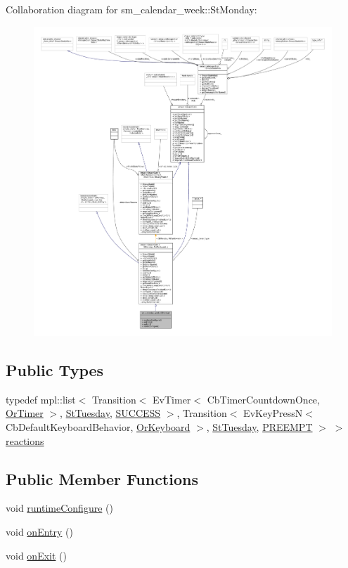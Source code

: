 Collaboration diagram for sm\+\_\+calendar\+\_\+week\+:\+:St\+Monday\+:
\nopagebreak
\begin{figure}[H]
\begin{center}
\leavevmode
\includegraphics[width=350pt]{structsm__calendar__week_1_1StMonday__coll__graph}
\end{center}
\end{figure}
\subsection*{Public Types}
\begin{DoxyCompactItemize}
\item 
typedef mpl\+::list$<$ Transition$<$ Ev\+Timer$<$ Cb\+Timer\+Countdown\+Once, \hyperlink{classsm__calendar__week_1_1OrTimer}{Or\+Timer} $>$, \hyperlink{structsm__calendar__week_1_1StTuesday}{St\+Tuesday}, \hyperlink{classSUCCESS}{S\+U\+C\+C\+E\+SS} $>$, Transition$<$ Ev\+Key\+PressN$<$ Cb\+Default\+Keyboard\+Behavior, \hyperlink{classsm__calendar__week_1_1OrKeyboard}{Or\+Keyboard} $>$, \hyperlink{structsm__calendar__week_1_1StTuesday}{St\+Tuesday}, \hyperlink{classPREEMPT}{P\+R\+E\+E\+M\+PT} $>$ $>$ \hyperlink{structsm__calendar__week_1_1StMonday_a6fee9231d13553ae7370225d9b1f28f9}{reactions}
\end{DoxyCompactItemize}
\subsection*{Public Member Functions}
\begin{DoxyCompactItemize}
\item 
void \hyperlink{structsm__calendar__week_1_1StMonday_aed3cf2a8d76902e9f35d66e99de0a1f9}{runtime\+Configure} ()
\item 
void \hyperlink{structsm__calendar__week_1_1StMonday_a6a64482ecac73d7c7b7304e9c27d0119}{on\+Entry} ()
\item 
void \hyperlink{structsm__calendar__week_1_1StMonday_a3c53bed49c8e977e8189fd630d62f516}{on\+Exit} ()
\end{DoxyCompactItemize}
